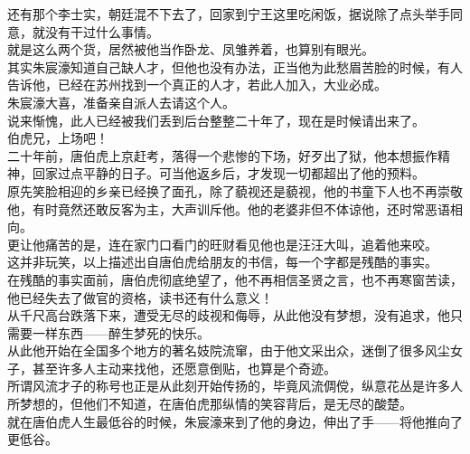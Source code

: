\begin{multicols}{\theparacolNo}
还有那个李士实，朝廷混不下去了，回家到宁王这里吃闲饭，据说除了点头举手同意，就没有干过什么事情。\\

就是这么两个货，居然被他当作卧龙、凤雏养着，也算别有眼光。\\

其实朱宸濠知道自己缺人才，但他也没有办法，正当他为此愁眉苦脸的时候，有人告诉他，已经在苏州找到一个真正的人才，若此人加入，大业必成。\\

朱宸濠大喜，准备亲自派人去请这个人。\\

说来惭愧，此人已经被我们丢到后台整整二十年了，现在是时候请出来了。\\

伯虎兄，上场吧！\\

二十年前，唐伯虎上京赶考，落得一个悲惨的下场，好歹出了狱，他本想振作精神，回家过点平静的日子。可当他返乡后，才发现一切都超出了他的预料。\\

原先笑脸相迎的乡亲已经换了面孔，除了藐视还是藐视，他的书童下人也不再崇敬他，有时竟然还敢反客为主，大声训斥他。他的老婆非但不体谅他，还时常恶语相向。\\

更让他痛苦的是，连在家门口看门的旺财看见他也是汪汪大叫，追着他来咬。\\

这并非玩笑，以上描述出自唐伯虎给朋友的书信，每一个字都是残酷的事实。\\

在残酷的事实面前，唐伯虎彻底绝望了，他不再相信圣贤之言，也不再寒窗苦读，他已经失去了做官的资格，读书还有什么意义！\\

从千尺高台跌落下来，遭受无尽的歧视和侮辱，从此他没有梦想，没有追求，他只需要一样东西——醉生梦死的快乐。\\

从此他开始在全国多个地方的著名妓院流窜，由于他文采出众，迷倒了很多风尘女子，甚至许多人主动来找他，还愿意倒贴，也算是个奇迹。\\

所谓风流才子的称号也正是从此刻开始传扬的，毕竟风流倜傥，纵意花丛是许多人所梦想的，但他们不知道，在唐伯虎那纵情的笑容背后，是无尽的酸楚。\\

就在唐伯虎人生最低谷的时候，朱宸濠来到了他的身边，伸出了手——将他推向了更低谷。\\


\end{multicols}
